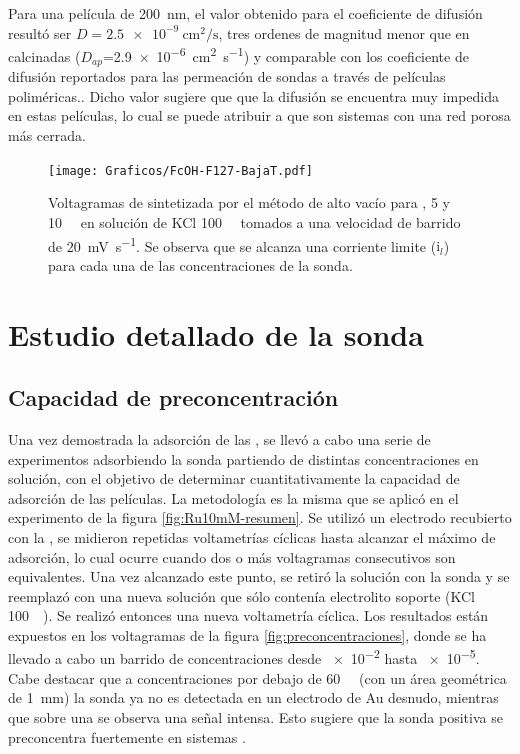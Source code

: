 		Para una película de \SI{200}{nm}, el valor obtenido para el coeficiente de difusión resultó ser $D=\SI{2.5e-9}{\square\cm\per\second}$, tres ordenes de magnitud menor que en \pdmF\space calcinadas ($D_{ap}$=\SI{2,9e-6}{\square\cm\per\second}) y comparable con los coeficiente de difusión reportados para las permeación de sondas a través de películas poliméricas.\cite{Kolb1993}. Dicho valor sugiere que que la difusión se encuentra muy impedida en estas películas, lo cual se puede atribuir a que son sistemas con una red porosa más cerrada. 
				
				\begin{figure}[ht!]
				\centering
		 	    \texttt{[image: Graficos/FcOH-F127-BajaT.pdf]}
		        \caption[Voltagrama para \fc\space en \pdm\space de baja temperatura]{Voltagramas de \pdmF\space sintetizada por el método de alto vacío para \fc{}, 5 y \SI{10}{\milli\Molar} en solución de KCl \SI{100}{\milli\Molar} tomados a una velocidad de barrido de \SI{20}{\milli\volt\per\second}. Se observa que se alcanza una corriente limite ($\text{i}_l$) para cada una de las concentraciones de la sonda.}
		        \label{fig:fcoh_bajaT}
		      	\end{figure}

\section{Estudio detallado de la sonda \texorpdfstring{\aminorutenioCompleto}{Ru(NH3)CL3}}
	
	\subsection{Capacidad de preconcentración}\label{sub:capacidad_de_preconcentraci_n}

		Una vez demostrada la adsorción \ru\space de las \pdm, se llevó a cabo una serie de experimentos adsorbiendo la sonda partiendo de distintas concentraciones en solución, con el objetivo de determinar cuantitativamente la capacidad de adsorción de las películas. La metodología es la misma que se aplicó en el experimento de la figura \ref{fig:Ru10mM-resumen}. Se utilizó un electrodo recubierto con la \pdmF, se midieron repetidas voltametrías cíclicas hasta alcanzar el máximo de adsorción, lo cual ocurre cuando dos o más voltagramas consecutivos son equivalentes. Una vez alcanzado este punto, se retiró la solución con la sonda y se reemplazó con una nueva solución que sólo contenía electrolito soporte (KCl \SI{100}{\milli\Molar}). Se realizó entonces una nueva voltametría cíclica. Los resultados están expuestos en los voltagramas de la figura \ref{fig:preconcentraciones}, donde se ha llevado a cabo un barrido de concentraciones desde \SI{e-2}{\Molar} hasta \SI{e-5}{\Molar}. Cabe destacar que a concentraciones por debajo de \SI{60}{\micro\Molar} (con un área geométrica de \SI{1}{mm}) la sonda ya no es detectada en un electrodo de Au desnudo, mientras que sobre una \pdm\space se observa una señal intensa. Esto sugiere que la sonda positiva se preconcentra fuertemente en sistemas \pdmF.


